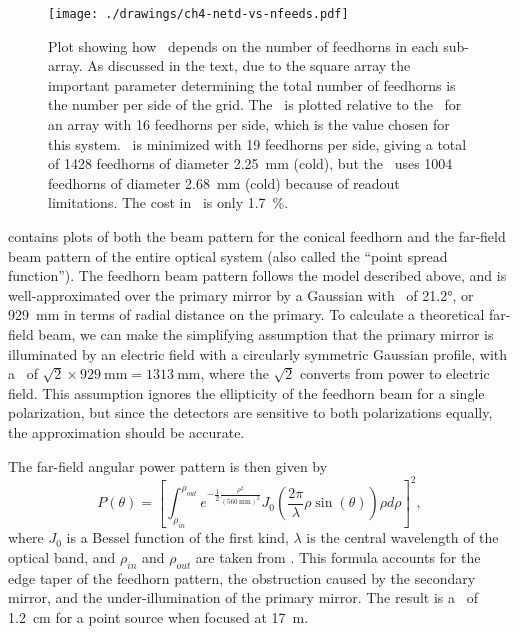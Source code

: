\begin{figure}
\centering
\texttt{[image: ./drawings/ch4-netd-vs-nfeeds.pdf]}
\caption[\NETD\ vs number of detectors]{
  Plot showing how \NETD\ depends on the number of feedhorns in each sub-array.
  As discussed in the text, due to the square array the important parameter determining the total number of feedhorns is the number per side of the grid.
  The \NETD\ is plotted relative to the \NETD\ for an array with 16 feedhorns per side, which is the value chosen for this system.
  \NETD\ is minimized with 19 feedhorns per side, giving a total of 1428 feedhorns of diameter \SI{2.25}{\mm} (cold), but the \Imager\ uses 1004 feedhorns of diameter \SI{2.68}{\mm} (cold) because of readout limitations.
  The cost in \NETD\ is only \SI{1.7}{\percent}.
}
\label{fig:ch4-netd-vs-nfeeds}
\end{figure}


 contains plots of both the beam pattern for the conical feedhorn and the far-field beam pattern of the entire optical system (also called the ``point spread function'').
The feedhorn beam pattern follows the model described above, and is well-approximated over the primary mirror by a Gaussian with \FWHM\ of \ang{21.2}, or \SI{929}{\mm} in terms of radial distance on the primary.
To calculate a theoretical far-field beam, we can make the simplifying assumption that the primary mirror is illuminated by an electric field with a circularly symmetric Gaussian profile, with a \FWHM\ of $\sqrt{2} \times \SI{929}{\mm} = \SI{1313}{\mm}$, where the $\sqrt{2}$ converts from power to electric field.
This assumption ignores the ellipticity of the feedhorn beam for a single polarization, but since the detectors are sensitive to both polarizations equally, the approximation should be accurate.

The far-field angular power pattern is then given by \cite{born_principles_1999}
\begin{equation}
  P(\theta) = \left[ \int_{\rho_{in}}^{\rho_{out}} e^{-\frac{1}{2} \frac{\rho^2}{(\SI{560}{\mm})^2}} J_0(\frac{2 \pi}{\lambda} \rho \sin(\theta)) \rho d\rho \right]^2,
\end{equation}
where $J_0$ is a Bessel function of the first kind, $\lambda$ is the central wavelength of the optical band, and $\rho_{in}$ and $\rho_{out}$ are taken from .
This formula accounts for the edge taper of the feedhorn pattern, the obstruction caused by the secondary mirror, and the under-illumination of the primary mirror.
The result is a \FWHM\ of \SI{1.2}{\cm} for a point source when focused at \SI{17}{\m}.

